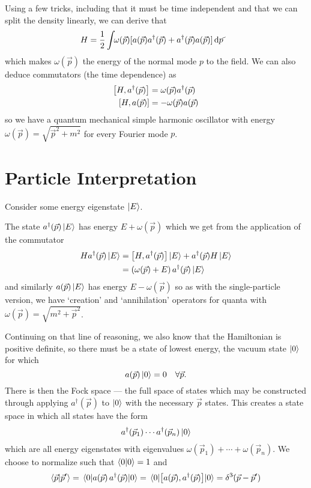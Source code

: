 \documentclass[notes.tex]{subfiles}
\begin{document}
Using a few tricks, including that it must be time independent and that we can split the density linearly, we can derive that 
\begin{align*}
    H &= \half{}\int\!\! \omega(\vec{p})[a(\vec{p})a^\dagger(\vec{p}) + a^\dagger(\vec{p})a(\vec{p})]\,\dds{p}
\end{align*}
which makes $ \omega(\vec{p})$ the energy of the normal mode $p$ to the field.
We can also deduce commutators (\ie the time dependence) as
\begin{align*}
    \commutator{H}{a^\dagger(\vec{p})} &= \omega(\vec{p}) a^\dagger(\vec{p})\\
    \commutator{H}{a(\vec{p})} &= -\omega(\vec{p}) a(\vec{p})
\end{align*}
so we have a quantum mechanical simple harmonic oscillator with energy $\omega(\vec{p}) = \sqrt{\vec{p}^2 + m^2}$ for every Fourier mode $p$.

\section{Particle Interpretation}
Consider some energy eigenstate $\ket{E}$. 

The state $a^\dagger(\vec{p})\ket{E}$ has energy $E+ \omega(\vec{p})$ which we get from the application of the commutator
\begin{align*}
    H a^\dagger(\vec{p}) \ket{E} &= \commutator{H}{a^\dagger(\vec{p})}\ket{E} + a^\dagger(\vec{p})H \ket{E}\\
    &= ( \omega(\vec{p}) + E)\, a^\dagger(\vec{p}) \ket{E}
\end{align*}
and similarly $a(\vec{p})\ket{E}$ has energy $E- \omega(\vec{p})$ so as with the single-particle version, we have `creation' and `annihilation' operators for quanta with $\omega(\vec{p}) = \sqrt{m^2 + \vec{p}^2}$. 

Continuing on that line of reasoning, we also know that the Hamiltonian is positive definite, so there must be a state of lowest energy, the vacuum state $\ket{0}$ for which $$a(\vec{p})\ket{0} = 0 \quad\forall\vec{p}.$$
There is then the Fock space --- the full space of states which may be constructed through applying $a^\dagger(\vec{p})$ to $\ket{0}$ with the necessary $\vec{p}$ states. This creates a state space in which all states have the form 
\begin{align*}
    a^\dagger(\vec{p}_1)\cdots a^\dagger(\vec{p}_n)\ket{0}
\end{align*}
which are all energy eigenstates with eigenvalues $\omega(\vec{p}_1) + \cdots + \omega(\vec{p}_n)$. We choose to normalize such that $\braket{0}{0} = 1$ and \[\braket{\vec{p}}{\vec{p}^\prime} = \mel{0}{a(\vec{p})\,a^\dagger(\vec{p})}{0} = \mel{0}{\commutator{a(\vec{p})}{a^\dagger(\vec{p})}}{0} = \deltaslash^3(\vec{p} - \vec{p}^\prime)\]
\end{document}
